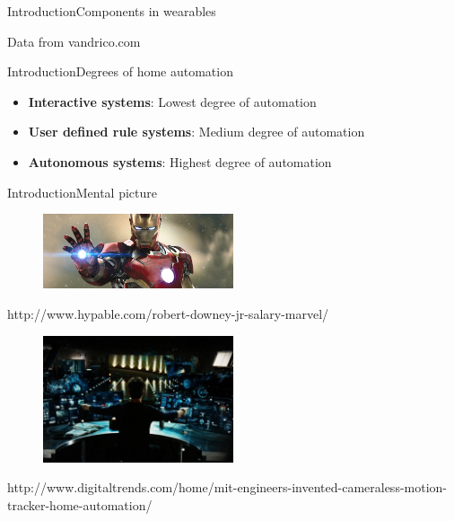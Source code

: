 \begin{frame}{Introduction}{Components in wearables}
\centering
\begin{figure}
  \scalebox{0.8}{}
\end{figure}
{\tiny Data from vandrico.com}
\end{frame}

\begin{frame}{Introduction}{Degrees of home automation}
\begin{itemize}
\item \textbf{Interactive systems}: Lowest degree of automation
\item \textbf{User defined rule systems}: Medium degree of automation
\item \textbf{Autonomous systems}: Highest degree of automation
\end{itemize}
\end{frame}

\begin{frame}{Introduction}{Mental picture}
\centering
\begin{figure}
  \includegraphics[width=0.5\textwidth]{images/iron-man-1}
\end{figure}
{\tiny http://www.hypable.com/robert-downey-jr-salary-marvel/}
\begin{figure}
  \includegraphics[width=0.5\textwidth]{images/iron-man-2}
\end{figure}
{\tiny http://www.digitaltrends.com/home/mit-engineers-invented-cameraless-motion-tracker-home-automation/}
\end{frame}

